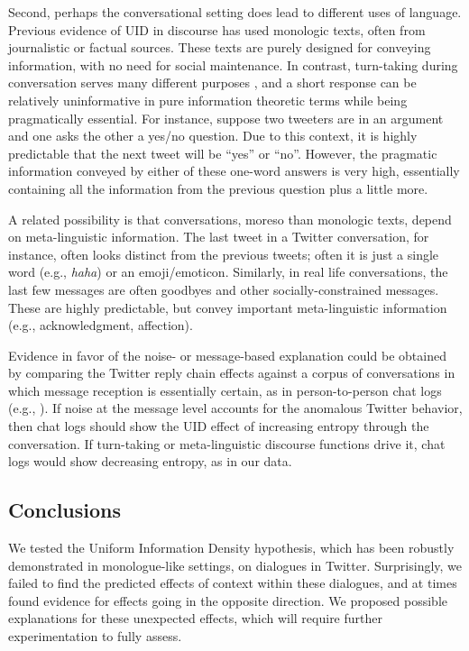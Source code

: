 \documentclass[11pt,letterpaper]{article}
\begin{document}
Second, perhaps the conversational setting does lead to different uses of language. Previous evidence of UID in discourse has used monologic texts, often from journalistic or factual sources. These texts are purely designed for conveying information, with no need for social maintenance. In contrast, turn-taking during conversation serves many different purposes \cite{clark1996}, and a short response can be relatively uninformative in pure information theoretic terms while being pragmatically essential. For instance, suppose two tweeters are in an argument and one asks the other a yes/no question.  Due to this context, it is highly predictable that the next tweet will be ``yes'' or ``no''.  However, the pragmatic information conveyed by either of these one-word answers is very high, essentially containing all the information from the previous question plus a little more.

A related possibility is that conversations, moreso than monologic texts, depend on meta-linguistic information.  The last tweet in a Twitter conversation, for instance, often looks distinct from the previous tweets; often it is just a single word (e.g., {\it haha}) or an emoji/emoticon.  Similarly, in real life conversations, the last few messages are often goodbyes and other socially-constrained messages.  These are highly predictable, but convey important meta-linguistic information (e.g., acknowledgment, affection).

Evidence in favor of the noise- or message-based explanation could be obtained by comparing the Twitter reply chain effects against a corpus of conversations in which message reception is essentially certain, as in person-to-person chat logs (e.g., ).  If noise at the message level accounts for the anomalous Twitter behavior, then chat logs should show the UID effect of increasing entropy through the conversation. If turn-taking or meta-linguistic discourse functions drive it, chat logs would show decreasing entropy, as in our data.

\subsection{Conclusions}

We tested the Uniform Information Density hypothesis, which has been robustly demonstrated in monologue-like settings, on dialogues in Twitter. Surprisingly, we failed to find the predicted effects of context within these dialogues, and at times found evidence for effects going in the opposite direction.  We proposed possible explanations for these unexpected effects, which will require further experimentation to fully assess.

%

\newpage


\end{document}

